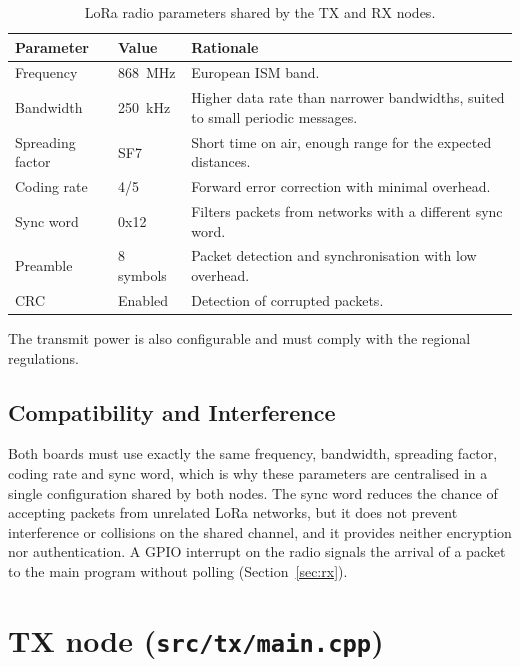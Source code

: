 \documentclass[informe,english]{plantilla}
\begin{document}
\begin{table}[htbp]
    \centering
    \small
    \begin{tabular}{@{}llp{}@{}}
        \toprule
        \textbf{Parameter} & \textbf{Value} & \textbf{Rationale} \\
        \midrule
        Frequency        & 868~MHz  & European ISM band. \\
        Bandwidth        & 250~kHz  & Higher data rate than narrower bandwidths, suited to small periodic messages. \\
        Spreading factor & SF7      & Short time on air, enough range for the expected distances. \\
        Coding rate      & 4/5      & Forward error correction with minimal overhead. \\
        Sync word        & 0x12     & Filters packets from networks with a different sync word. \\
        Preamble         & 8 symbols & Packet detection and synchronisation with low overhead. \\
        CRC              & Enabled  & Detection of corrupted packets. \\
        \bottomrule
    \end{tabular}
    \caption{LoRa radio parameters shared by the TX and RX nodes.}
    \label{tab:lora-params}
\end{table}

The transmit power is also configurable and must comply with the regional regulations.

\subsection{Compatibility and Interference}
\label{sec:lora-software}

Both boards must use exactly the same frequency, bandwidth, spreading factor, coding rate and sync word, which is why these parameters are centralised in a single configuration shared by both nodes. The sync word reduces the chance of accepting packets from unrelated LoRa networks, but it does not prevent interference or collisions on the shared channel, and it provides neither encryption nor authentication. A GPIO interrupt on the radio signals the arrival of a packet to the main program without polling (Section~\ref{sec:rx}).

\section{TX node (\texttt{src/tx/main.cpp})}
\label{sec:tx}
\end{document}

